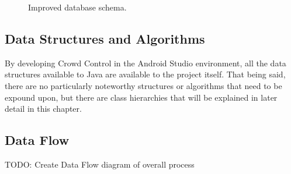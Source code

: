 	\begin{figure}[tbh!]
	\begin{center}
	\end{center}
	\caption{Improved database schema. \label{MidDBSchema}}
	\end{figure}

 \subsection{Data Structures and Algorithms}
 By developing Crowd Control in the Android Studio environment, all the data structures available to Java are available to the project itself. That being said, there are no particularly noteworthy structures or algorithms that need to be expound upon, but there are class hierarchies that will be explained in later detail in this chapter.
 
 \subsection{Data Flow}
 TODO: Create Data Flow diagram of overall process
 
